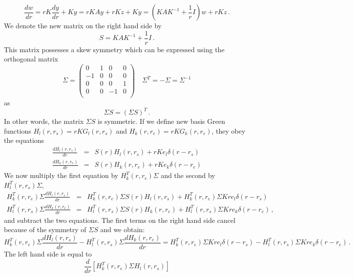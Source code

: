 \documentclass[11pt,a4paper]{article}
\begin{document}
%
\begin{equation}
\frac{dw}{dr}=rK\frac{dy}{dr}+Ky=rKAy+rKz+Ky=(KAK^{-1}+\frac{1}{r}I)w+rKz \,.
\end{equation}
%
We denote the new matrix on the right hand side by
\begin{equation}
S=KAK^{-1}+\frac{1}{r}I \,.
\end{equation}
%
This matrix possesses a skew symmetry which can be expressed using the orthogonal matrix 
\begin{equation}
\Sigma = \left(\begin{array}{cccc}
0 & 1 & 0 & 0 \\
-1 & 0 & 0 & 0 \\
0 & 0 & 0 & 1 \\
0 & 0 & -1 & 0 \\
\end{array}\right) \quad \Sigma^T=-\Sigma=\Sigma^{-1}
\end{equation}
%
as
\begin{equation}
\Sigma S = (\Sigma S)^T \,.
\end{equation}
%
In other words, the matrix $\Sigma S$ is symmetric. If we define new basis Green functions $H_l(r,r_s)=rKG_l(r,r_s)$ and $H_k(r,r_e)=rKG_k(r,r_e)$, they obey the equations
%
\begin{eqnarray}
\frac{dH_l(r,r_s)}{dr} & = & S(r)H_l(r,r_s)+rKe_l\delta(r-r_s) \nonumber \\
\frac{dH_k(r,r_e)}{dr} & = & S(r)H_k(r,r_e)+rKe_k\delta(r-r_e)
\end{eqnarray}
%
We now multiply the first equation by $H_k^T(r,r_e)\Sigma$ and the second by $H_l^T(r,r_s)\Sigma$,
%
\begin{eqnarray}
H_k^T(r,r_e)\Sigma\frac{dH_l(r,r_s)}{dr} & = & H_k^T(r,r_e)\Sigma S(r)H_l(r,r_s)+H_k^T(r,r_e)\Sigma Kre_l\delta(r-r_s) \nonumber \\
H_l^T(r,r_s)\Sigma\frac{dH_k(r,r_e)}{dr} & = & H_l^T(r,r_s)\Sigma S(r)H_k(r,r_e)+H_l^T(r,r_s)\Sigma Kre_k\delta(r-r_e) \,,
\end{eqnarray}
%
and subtract the two equations. The first terms on the right hand side
cancel because of the symmetry of $\Sigma S$ and we obtain:
\begin{equation}
H_k^T(r,r_e)\Sigma\frac{dH_l(r,r_s)}{dr}-H_l^T(r,r_s)\Sigma\frac{dH_k(r,r_e)}{dr}=
H_k^T(r,r_e)\Sigma Kre_l\delta(r-r_s) - H_l^T(r,r_s)\Sigma Kre_k\delta(r-r_e) \,.
\end{equation}
%
The left hand side is equal to
\begin{equation}
\frac{d}{dr}\left[H_k^T(r,r_e)\Sigma H_l(r,r_s)\right]
\end{equation}
\end{document}
